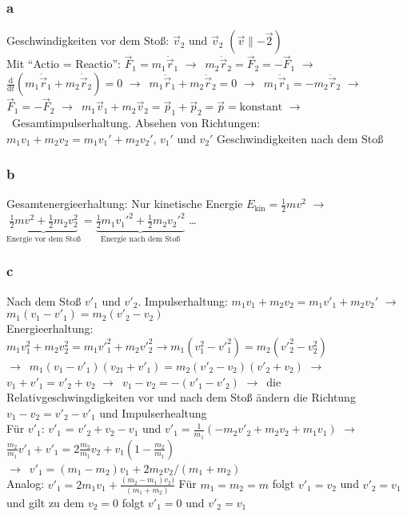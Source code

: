 \documentclass[oneside]{book}
\theoremstyle{definition}
\newcommand{\conseq}{$\rightarrow$~}
\renewcommand{\d}{\mathrm d}
\newcommand{\dd}[1]{\frac{\d}{\d #1}}
\newcommand{\dotvec}[1]{\dot{\vec{#1}}}
\newcommand{\ddotvec}[1]{\ddot{\vec{#1}}}
\begin{document}
\subsubsection{a}
Geschwindigkeiten vor dem Stoß: $\vec{v}_2$ und $\vec{v}_2$ $(\vec{v} \parallel - \vec{2})$\\
Mit "`Actio = Reactio"': $\vec{F}_1 = m_1 \ddotvec{r}_1$ \conseq $m_2 \ddotvec{r}_2 = \vec{F}_2 = - \vec{F}_1$ \conseq $\dd t (m_1 \dotvec{r}_1 + m_2 \dotvec{r}_2) = 0$ \conseq $m_1 \ddotvec{r}_1 + m_2 \ddotvec{r}_2 = 0$ \conseq $m_1 \ddotvec{r}_1 = -m_2 \ddotvec{r}_2$ \conseq $\vec{F}_1 = -\vec{F}_2$ \conseq $m_1 \vec{v}_1 + m_2 \vec{v}_2 = \vec{p}_1 + \vec{p}_2 = \vec{p} = \text{konstant}$ \conseq Gesamtimpulserhaltung. Absehen von Richtungen: $m_1 v_1 + m_2 v_2 = m_1 v_1' + m_2 v_2'$, $v_1'$ und $v_2'$ Geschwindigkeiten nach dem Stoß

\subsubsection{b}
Gesamtenergieerhaltung: Nur kinetische Energie $E_\text{kin} = \frac12 m v^2$ \conseq $\underbrace{\frac12 m v^2 + \frac12 m_2 v_2^2}_\text{Energie vor dem Stoß} = \underbrace{\frac12 m_1 v_1'^2 + \frac{1}{2} m_2 v_2'^2}_\text{Energie nach dem Stoß}$ \dots

\subsubsection{c}
Nach dem Stoß $v'_1$ und $v'_2$.
Impulserhaltung: $m_1v_1 +m_2v_2 = m_1v'_1+m_2v_2'$ \conseq $m_1(v_1 - v'_1) = m_2(v'_2 - v_2)$\\
Energieerhaltung: $m_1v_1^2 + m_2v_2^2 = m_1{v'}_1^2 + m_2{v'}_2^2 \rightarrow m_1(v_1^2-{v'}_1^2) = m_2({v'}_2^2 - v_2^2)$\\
\conseq $m_1(v_1-{v'}_1)(v_{21}+{v'}_1) = m_2 ({v'}_2 - v_2) ({v'}_2 + v_2)$
\conseq $v_1 + {v'}_1 = {v'}_2 + v_2$
\conseq $v_1 - v_2 = -({v'}_1 - {v'}_2)$ \conseq die Relativgeschwingdigkeiten vor und nach dem Stoß ändern die Richtung\\
$v_1 - v_2 = {v'}_2-{v'}_1$ und Impulserhealtung\\
Für ${v'}_1$: ${v'}_1$ = ${v'}_2 + v_2 - v_1$ und ${v'}_1 = \frac{1}{m_1} (-m_2 {v'}_2 + m_2v_2 + m_1v_1)$ \conseq $\frac{m_2}{m_1} {v'}_1 + {v'}_1 = 2\frac{m_2}{m_1} v_2 + v_1 (1-\frac{m_2}{m_1})$\\
\conseq ${v'}_1 = (m_1 - m_2)v_1 + 2m_2v_2 / (m_1 + m_2)$\\
Analog: ${v'}_1 = 2m_1v_1 + \frac{(m_2 - m_1)v_2)}{(m_1 + m_2)}$
Für $m_1 = m_2 = m$ folgt ${v'}_1 = v_2$ und ${v'}_2 = v_1$
und gilt zu dem $v_2 = 0$ folgt ${v'}_1 = 0$ und ${v'}_2 = v_1$
\end{document}
